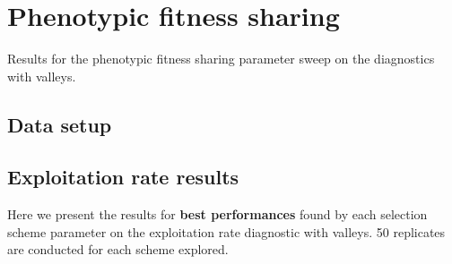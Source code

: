 \documentclass[]{book}
\newenvironment{Shaded}{\begin{snugshade}}{\end{snugshade}}
\newcommand{\DataTypeTok}[1]{\textcolor[rgb]{0.13,0.29,0.53}{#1}}
\newcommand{\KeywordTok}[1]{\textcolor[rgb]{0.13,0.29,0.53}{\textbf{#1}}}
\newcommand{\NormalTok}[1]{#1}
\newcommand{\OperatorTok}[1]{\textcolor[rgb]{0.81,0.36,0.00}{\textbf{#1}}}
\newcommand{\OtherTok}[1]{\textcolor[rgb]{0.56,0.35,0.01}{#1}}
\newcommand{\StringTok}[1]{\textcolor[rgb]{0.31,0.60,0.02}{#1}}
\begin{document}
\hypertarget{phenotypic-fitness-sharing}{%
\chapter{Phenotypic fitness sharing}\label{phenotypic-fitness-sharing}}

Results for the phenotypic fitness sharing parameter sweep on the diagnostics with valleys.

\hypertarget{data-setup-3}{%
\section{Data setup}\label{data-setup-3}}

\begin{Shaded}
\end{Shaded}

\hypertarget{exploitation-rate-results-3}{%
\section{Exploitation rate results}\label{exploitation-rate-results-3}}

Here we present the results for \textbf{best performances} found by each selection scheme parameter on the exploitation rate diagnostic with valleys.
50 replicates are conducted for each scheme explored.
\end{document}
